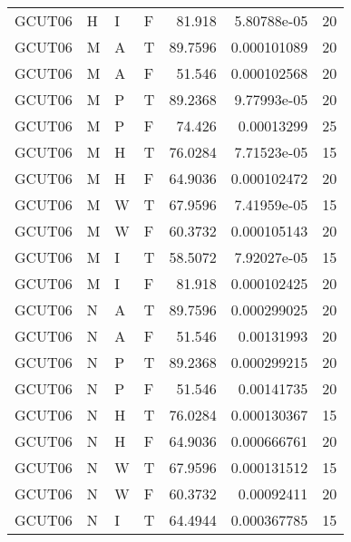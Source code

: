 \begin{longtable}{llllrrr}
    GCUT06   & H         & I         & F          & 81.918     & 5.80788e-05 & 20       \\
    GCUT06   & M         & A         & T          & 89.7596    & 0.000101089 & 20       \\
    GCUT06   & M         & A         & F          & 51.546     & 0.000102568 & 20       \\
    GCUT06   & M         & P         & T          & 89.2368    & 9.77993e-05 & 20       \\
    GCUT06   & M         & P         & F          & 74.426     & 0.00013299  & 25       \\
    GCUT06   & M         & H         & T          & 76.0284    & 7.71523e-05 & 15       \\
    GCUT06   & M         & H         & F          & 64.9036    & 0.000102472 & 20       \\
    GCUT06   & M         & W         & T          & 67.9596    & 7.41959e-05 & 15       \\
    GCUT06   & M         & W         & F          & 60.3732    & 0.000105143 & 20       \\
    GCUT06   & M         & I         & T          & 58.5072    & 7.92027e-05 & 15       \\
    GCUT06   & M         & I         & F          & 81.918     & 0.000102425 & 20       \\
    GCUT06   & N         & A         & T          & 89.7596    & 0.000299025 & 20       \\
    GCUT06   & N         & A         & F          & 51.546     & 0.00131993  & 20       \\
    GCUT06   & N         & P         & T          & 89.2368    & 0.000299215 & 20       \\
    GCUT06   & N         & P         & F          & 51.546     & 0.00141735  & 20       \\
    GCUT06   & N         & H         & T          & 76.0284    & 0.000130367 & 15       \\
    GCUT06   & N         & H         & F          & 64.9036    & 0.000666761 & 20       \\
    GCUT06   & N         & W         & T          & 67.9596    & 0.000131512 & 15       \\
    GCUT06   & N         & W         & F          & 60.3732    & 0.00092411  & 20       \\
    GCUT06   & N         & I         & T          & 64.4944    & 0.000367785 & 15       \\

\end{longtable}
